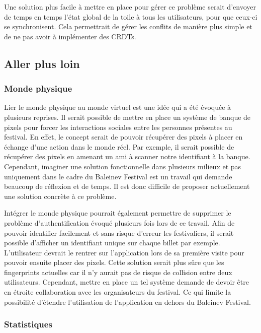 Une solution plus facile à mettre en place pour gérer ce problème serait d'envoyer de temps en temps l'état global de la toile à tous les utilisateurs, pour que ceux-ci se synchronisent. Cela permettrait de gérer les conflits de manière plus simple et de ne pas avoir à implémenter des CRDTs.

\subsection{Aller plus loin}

\subsubsection{Monde physique}

Lier le monde physique au monde virtuel est une idée qui a été évoquée à plusieurs reprises. Il serait possible de mettre en place un système de banque de pixels pour forcer les interactions sociales entre les personnes présentes au festival. En effet, le concept serait de pouvoir récupérer des pixels à placer en échange d'une action dans le monde réel. Par exemple, il serait possible de récupérer des pixels en amenant un ami à scanner notre identifiant à la banque. Cependant, imaginer une solution fonctionnelle dans plusieurs milieux et pas uniquement dans le cadre du Baleinev Festival est un travail qui demande beaucoup de réflexion et de temps. Il est donc difficile de proposer actuellement une solution concrète à ce problème.

Intégrer le monde physique pourrait également permettre de supprimer le problème d'authentification évoqué plusieurs fois lors de ce travail. Afin de pouvoir identifier facilement et sans risque d'erreur les festivaliers, il serait possible d'afficher un identifiant unique sur chaque billet par exemple. L'utilisateur devrait le rentrer sur l'application lors de sa première visite pour pouvoir ensuite placer des pixels. Cette solution serait plus sûre que les fingerprints actuelles car il n'y aurait pas de risque de collision entre deux utilisateurs. Cependant, mettre en place un tel système demande de devoir être en étroite collaboration avec les organisateurs du festival. Ce qui limite la possibilité d'étendre l'utilisation de l'application en dehors du Baleinev Festival.

\subsubsection{Statistiques}

